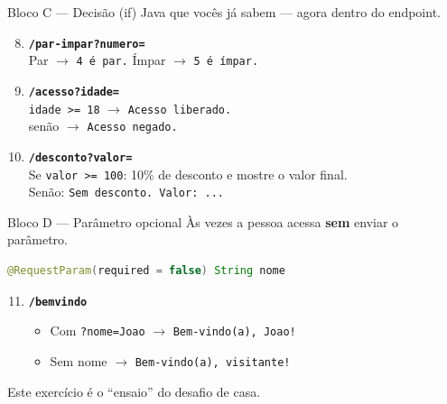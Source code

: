 \documentclass[aspectratio=169,11pt]{beamer}
\begin{document}
\begin{frame}{Bloco C --- Decisão (if)}
  Java que vocês já sabem --- agora dentro do endpoint.

  \vspace{0.4em}
  \begin{enumerate}
    \setcounter{enumi}{7}
    \item \textbf{\texttt{/par-impar?numero=}}\\
          Par $\rightarrow$ \texttt{4 é par.} \quad
          Ímpar $\rightarrow$ \texttt{5 é ímpar.}
    \item \textbf{\texttt{/acesso?idade=}}\\
          \texttt{idade >= 18} $\rightarrow$ \texttt{Acesso liberado.}\\
          senão $\rightarrow$ \texttt{Acesso negado.}
    \item \textbf{\texttt{/desconto?valor=}}\\
          Se \texttt{valor >= 100}: 10\% de desconto e mostre o valor final.\\
          Senão: \texttt{Sem desconto. Valor: ...}
  \end{enumerate}
\end{frame}

\begin{frame}[fragile]{Bloco D --- Parâmetro opcional}
  Às vezes a pessoa acessa \textbf{sem} enviar o parâmetro.

\begin{lstlisting}[language=Java,basicstyle=\ttfamily\footnotesize]
@RequestParam(required = false) String nome
\end{lstlisting}

  \vspace{0.4em}
  \begin{enumerate}
    \setcounter{enumi}{10}
    \item \textbf{\texttt{/bemvindo}}
      \begin{itemize}
        \item Com \texttt{?nome=Joao} $\rightarrow$
              \texttt{Bem-vindo(a), Joao!}
        \item Sem nome $\rightarrow$
              \texttt{Bem-vindo(a), visitante!}
      \end{itemize}
  \end{enumerate}

  \vspace{0.5em}
  Este exercício é o ``ensaio'' do desafio de casa.
\end{frame}
\end{document}
